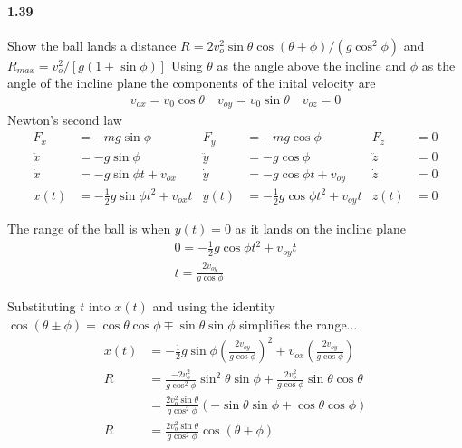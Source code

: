 \documentclass[../problems.tex]{subfiles}
\begin{document}
\paragraph{1.39}
Show the ball lands a distance $R =2 v_o^2 \sin{\theta} \cos{\left(\theta + \phi\right)}/
\left( g \cos^2{\phi} \right)$ and $R_{max} = v_o^2/[g(1+ \sin{\phi})]$
\barh
Using $\theta$ as the angle above the incline and $\phi$ as the angle of the incline plane
the components of the inital velocity are
\begin{align*}
    v_{ox} = v_0 \cos{\theta} \quad v_{oy} = v_0 \sin{\theta} \quad v_{oz} = 0
\end{align*}
Newton's second law
\begin{align*}
    F_x &= -m g \sin{\phi} & F_y &= -m g \cos{\phi} & F_z &= 0 \\
    \ddot{x} &= -g \sin{\phi} & \ddot{y} &= -g \cos{\phi} & \ddot{z} &= 0 \\
    \dot{x} &= -g \sin{\phi} t + v_{ox} & \dot{y} &= -g \cos{\phi} t + v_{oy} & \dot{z} & = 0 \\
    x(t) &= -\frac{1}{2} g \sin{\phi} t^2 + v_{ox} t & y(t) &= -\frac{1}{2} g \cos{\phi} t^2 
    + v_{oy} t & z(t) &= 0
\end{align*}

The range of the ball is when $y(t) = 0$ as it lands on the incline plane
\begin{align*}
    0 = -\frac{1}{2} g \cos{\phi} t^2 + v_{oy} t \\
    t = \frac{2 v_{oy}}{g \cos{\phi}}
\end{align*}

Substituting $t$ into $x(t)$ and using the identity $\cos{\left(\theta \pm \phi\right)} 
= \cos{\theta} \cos{\phi} \mp \sin{\theta} \sin{\phi}$ simplifies the range...
\begin{align*}
    x (t) &= -\frac{1}{2} g \sin{\phi} \left( \frac{2 v_{oy}}{g \cos{\phi}} \right)^2 + v_{ox} 
    \left( \frac{2 v_{oy}}{g \cos{\phi}} \right) \\
    R &= \frac{-2 v_o^2}{g\cos^2{\phi}} \sin^2{\theta} \sin{\phi} 
    + \frac{2 v_o^2}{g\cos{\phi}} \sin{\theta} \cos{\theta} \\
    &= \frac{2v_o^2 \sin{\theta}}{g \cos^2{\phi}} \left( -\sin{\theta} \sin{\phi} 
    + \cos{\theta} \cos{\phi} \right) \\
    R &= \frac{2v_o^2 \sin{\theta}}{g \cos^2{\phi}} \cos{\left(\theta + \phi\right)}
\end{align*}
\end{document}
